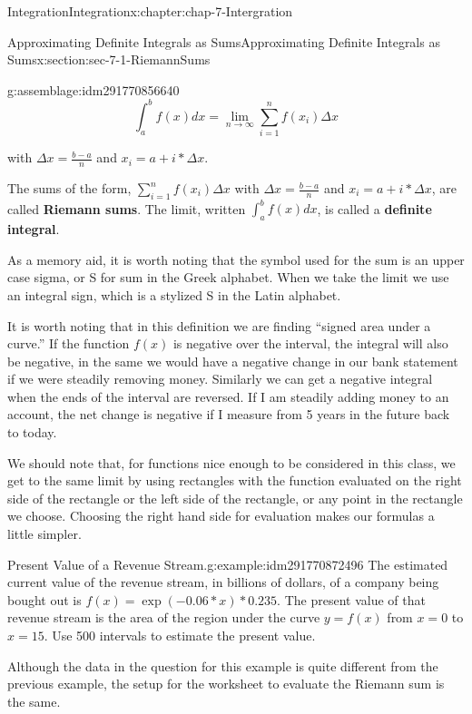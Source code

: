 \documentclass[oneside,10pt,]{book}
\newcommand{\terminology}[1]{\textbf{#1}}
\numberwithin{equation}{section}
\begin{document}
\begin{chapterptx}{Integration}{}{Integration}{}{}{x:chapter:chap-7-Intergration}
\begin{sectionptx}{Approximating Definite Integrals as Sums}{}{Approximating Definite Integrals as Sums}{}{}{x:section:sec-7-1-RiemannSums}
\begin{assemblage}{}{g:assemblage:idm291770856640}
%
\begin{equation*}
\int_a^bf(x)  dx=\lim_{n\to \infty} \sum_{i=1}^nf (x_i)\Delta x 
\end{equation*}
%
\par
with \(\Delta x=\frac{b-a}{n}\)  and  \(x_i=a+i*\Delta x\).%
\end{assemblage}
The sums of the form, \(\sum_{i=1}^n  f(x_i)\Delta x\) with \(\Delta x=\frac{b-a}{n}\) and \(x_i=a+i*\Delta x\), are called \terminology{Riemann sums}.  The limit, written \(\int_a^bf(x)  dx\), is called a \terminology{definite integral}.%
\par
As a memory aid, it is worth noting that the symbol used for the sum is an upper case sigma, or S for sum in the Greek alphabet.  When we take the limit we use an integral sign, which is a stylized S in the Latin alphabet.%
\par
It is worth noting that in this definition we are finding “signed area under a curve.”  If the function \(f(x)\) is negative over the interval, the integral will also be negative, in the same we would have a negative change in our bank statement if we were steadily removing money.  Similarly we can get a negative integral when the ends of the interval are reversed.  If I am steadily adding money to an account, the net change is negative if I measure from 5 years in the future back to today.%
\par
We should note that, for functions nice enough to be considered in this class, we get to the same limit by using rectangles with the function evaluated on the right side of the rectangle or the left side of the rectangle, or any point in the rectangle we choose.  Choosing the right hand side for evaluation makes our formulas a little simpler.%
\begin{example}{Present Value of a Revenue Stream.}{g:example:idm291770872496}%
The estimated current value of the revenue stream, in billions of dollars, of a company being bought out is \(f(x)=\exp(-0.06*x)*0.235\). The present value of that revenue stream is the area of the region under the curve \(y=f(x)\) from \(x=0\) to \(x=15\).  Use 500 intervals to estimate the present value.%
\par
Although the data in the question for this example is quite different from the previous example, the setup for the worksheet to evaluate the Riemann sum is the same.%
\begin{sidebyside}{1}{0.1}{0.1}{0}%
\begin{sbspanel}{0.8}%

\end{sbspanel}
\end{sidebyside}
\end{example}
\end{sectionptx}
\end{chapterptx}
\end{document}
